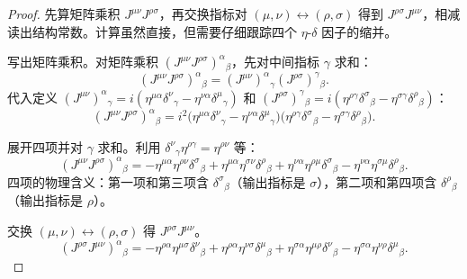\begin{proof}
先算矩阵乘积 $J^{\mu\nu}J^{\rho\sigma}$，再交换指标对 $(\mu,\nu)\leftrightarrow(\rho,\sigma)$ 得到 $J^{\rho\sigma}J^{\mu\nu}$，相减读出结构常数。计算虽然直接，但需要仔细跟踪四个 $\eta$-$\delta$ 因子的缩并。

写出矩阵乘积。对矩阵乘积 $(J^{\mu\nu}J^{\rho\sigma})^\alpha{}_\beta$，先对中间指标 $\gamma$ 求和：
\begin{equation*}
(J^{\mu\nu}J^{\rho\sigma})^\alpha{}_\beta=(J^{\mu\nu})^\alpha{}_\gamma(J^{\rho\sigma})^\gamma{}_\beta.
\end{equation*}
代入定义 $(J^{\mu\nu})^\alpha{}_\gamma=i(\eta^{\mu\alpha}\delta^\nu{}_\gamma-\eta^{\nu\alpha}\delta^\mu{}_\gamma)$ 和 $(J^{\rho\sigma})^\gamma{}_\beta=i(\eta^{\rho\gamma}\delta^\sigma{}_\beta-\eta^{\sigma\gamma}\delta^\rho{}_\beta)$：
\begin{equation*}
(J^{\mu\nu}J^{\rho\sigma})^\alpha{}_\beta=i^2\big(\eta^{\mu\alpha}\delta^\nu{}_\gamma-\eta^{\nu\alpha}\delta^\mu{}_\gamma\big)\big(\eta^{\rho\gamma}\delta^\sigma{}_\beta-\eta^{\sigma\gamma}\delta^\rho{}_\beta\big).
\end{equation*}

展开四项并对 $\gamma$ 求和。利用 $\delta^\nu{}_\gamma\eta^{\rho\gamma}=\eta^{\rho\nu}$ 等：
\begin{equation*}
(J^{\mu\nu}J^{\rho\sigma})^\alpha{}_\beta
=-\eta^{\mu\alpha}\eta^{\rho\nu}\delta^\sigma{}_\beta
+\eta^{\mu\alpha}\eta^{\sigma\nu}\delta^\rho{}_\beta
+\eta^{\nu\alpha}\eta^{\rho\mu}\delta^\sigma{}_\beta
-\eta^{\nu\alpha}\eta^{\sigma\mu}\delta^\rho{}_\beta.
\end{equation*}
四项的物理含义：第一项和第三项含 $\delta^\sigma{}_\beta$（输出指标是 $\sigma$），第二项和第四项含 $\delta^\rho{}_\beta$（输出指标是 $\rho$）。

交换 $(\mu,\nu)\leftrightarrow(\rho,\sigma)$ 得 $J^{\rho\sigma}J^{\mu\nu}$。
\begin{equation*}
(J^{\rho\sigma}J^{\mu\nu})^\alpha{}_\beta
=-\eta^{\rho\alpha}\eta^{\mu\sigma}\delta^\nu{}_\beta
+\eta^{\rho\alpha}\eta^{\nu\sigma}\delta^\mu{}_\beta
+\eta^{\sigma\alpha}\eta^{\mu\rho}\delta^\nu{}_\beta
-\eta^{\sigma\alpha}\eta^{\nu\rho}\delta^\mu{}_\beta.
\end{equation*}


\end{proof}
